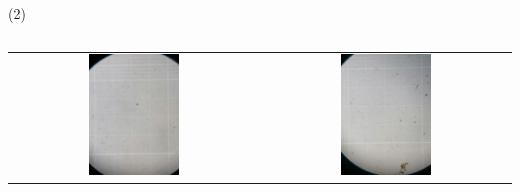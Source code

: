 \begin{frame}{ (2)}
\begin{columns}
\begin{column}{0.4\textwidth}
\begin{center}
\begin{tabular}{cc}
         \includegraphics[width=0.38\textwidth]{2022_ConteoMicroAlgas/figs/CuadranteC}&
         \includegraphics[width=0.38\textwidth]{2022_ConteoMicroAlgas/figs/CuadranteD}\\
          \end{tabular}
\end{center}
\end{column} 
\end{columns} 
\end{frame}


